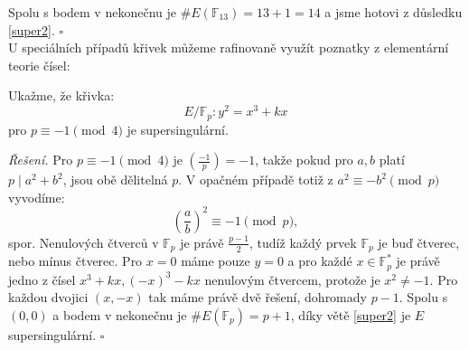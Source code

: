\documentclass[12pt]{report}
\begin{document}
Spolu s bodem v nekonečnu je $\# E(\mathbb{F}_{13})=13+1=14$ a jsme hotovi z důsledku \ref{super2}. \hfill $\square$\\

U speciálních případů křivek můžeme rafinovaně využít poznatky z elementární teorie čísel:

\begin{priklad}
Ukažme, že křivka:
 $$E/\mathbb{F}_p : y^2 = x^3 + kx$$
pro $ p \equiv -1 \pmod{4}$ je supersingulární.
\end{priklad}
\noindent \textit{Řešení.} Pro $p \equiv -1 \pmod{4}$ je $\genfrac{(}{)}{}{}{-1}{p} = -1$, takže pokud pro $a,b$ platí $p \mid a^2 + b^2$, jsou obě dělitelná $p$. V opačném případě totiž z $a^2 \equiv -b^2 \pmod{p}$ vyvodíme:
\begin{equation*}
\left(\frac{a}{b}\right)^2 \equiv -1 \pmod{p},
\end{equation*} 
spor. Nenulových čtverců v $\mathbb{F}_p$ je právě $\frac{p-1}{2}$, tudíž každý prvek $\mathbb{F}_p$ je buď čtverec, nebo mínus čtverec. Pro $x= 0$ máme pouze $y = 0$ a pro každé $x \in \mathbb{F}_p^*$ je právě jedno z čísel $x^3+kx, (-x)^3-kx$ nenulovým čtvercem, protože je $x^2 \neq -1$. Pro každou dvojici $(x,-x)$ tak máme právě dvě řešení, dohromady $p-1$. Spolu s $(0,0)$ a bodem v nekonečnu je $\# E(\mathbb{F}_p) = p+1$, díky větě \ref{super2} je $E$ supersingulární. \hfill $\square$\\
\end{document}
